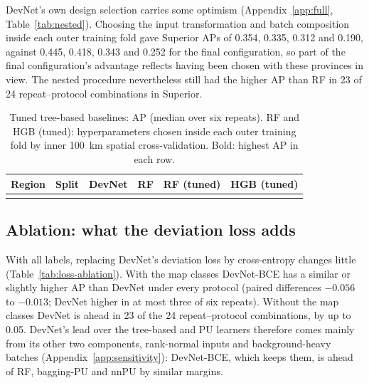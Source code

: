 \documentclass[pdflatex,sn-apa]{sn-jnl}
\begin{document}
DevNet's own design selection carries some optimism (Appendix~\ref{app:full}, Table~\ref{tab:nested}). Choosing the input transformation and batch composition inside each outer training fold gave Superior APs of 0.354, 0.335, 0.312 and 0.190, against 0.445, 0.418, 0.343 and 0.252 for the final configuration, so part of the final configuration's advantage reflects having been chosen with these provinces in view. The nested procedure nevertheless still had the higher AP than RF in 23 of 24 repeat--protocol combinations in Superior.

\begin{table}[t]
\caption{Tuned tree-based baselines: AP (median over six repeats). RF and HGB (tuned): hyperparameters chosen inside each outer training fold by inner 100~km spatial cross-validation. Bold: highest AP in each row.}\label{tab:controls}
\footnotesize
\setlength{\tabcolsep}{3pt}
\begin{tabular*}{\textwidth}{@{\extracolsep\fill}llcccc}
\toprule
Region & Split & DevNet & RF & RF (tuned) & HGB (tuned) \\
\midrule
\botrule
\end{tabular*}
\end{table}

\subsection{Ablation: what the deviation loss adds}\label{sec:res-ablation}

With all labels, replacing DevNet's deviation loss by cross-entropy changes little (Table~\ref{tab:loss-ablation}). With the map classes DevNet-BCE has a similar or slightly higher AP than DevNet under every protocol (paired differences $-0.056$ to $-0.013$; DevNet higher in at most three of six repeats). Without the map classes DevNet is ahead in 23 of the 24 repeat--protocol combinations, by up to 0.05. DevNet's lead over the tree-based and PU learners therefore comes mainly from its other two components, rank-normal inputs and background-heavy batches (Appendix~\ref{app:sensitivity}): DevNet-BCE, which keeps them, is ahead of RF, bagging-PU and nnPU by similar margins.
\end{document}
